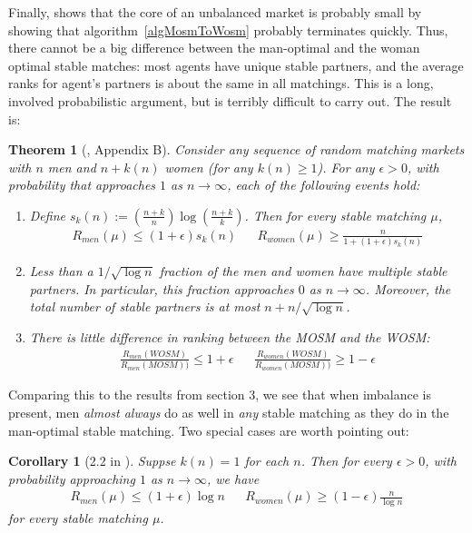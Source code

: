 \documentclass[12pt]{article}
\newtheorem{corollary}[definition]{Corollary}
\newtheorem{theorem}[definition]{Theorem}
\begin{document}
  Finally, \cite{AshlagiUnbalancedCompetition17} shows that the core of an
  unbalanced market is probably small by showing that
  algorithm~\ref{algMosmToWosm} probably terminates quickly.
  Thus, there cannot be a big difference between the man-optimal and the woman
  optimal stable matches: most agents have unique stable partners, and the
  average ranks for agent's partners is about the same in all matchings.
  This is a long, involved probabilistic argument, but is terribly difficult to
  carry out. The result is:

  \begin{theorem}[\cite{AshlagiUnbalancedCompetition17}, Appendix B]
    Consider any sequence of random matching markets with $n$ men and $n+k(n)$ women
    (for any $k(n)\ge 1$).
    For any $\epsilon>0$, with probability that approaches $1$ as $n\to\infty$,
    each of the following events hold:
    \begin{enumerate}
      \item Define $ s_k(n) := \left(\frac{n+k} n\right) 
        \log\left(\frac{n+k} k\right)$.
        Then for every stable matching $\mu$,
        \begin{align*}
          R_{men}(\mu) \le (1+\epsilon)s_k(n) &&
          R_{women}(\mu) \ge \frac n {1 + (1+\epsilon)s_k(n)}
        \end{align*}
      \item Less than a $1/\sqrt{\log n}$ fraction of the men and women have
        multiple stable partners. In particular, this fraction approaches $0$ as
        $n\to\infty$.
        Moreover, the total number of stable partners
        is at most $n + n/\sqrt{\log n}$.
      \item There is little difference in ranking between the MOSM and the WOSM:
        \begin{align*}
          \frac{R_{men}(WOSM)}{R_{men}(MOSM))} \le 1+\epsilon &&
          \frac{R_{women}(WOSM)}{R_{women}(MOSM))} \ge 1-\epsilon
        \end{align*}
    \end{enumerate}
  \end{theorem}

  Comparing this to the results from section 3, we see that when imbalance is
  present, men \emph{almost always} do as well in \emph{any} stable matching as
  they do in the man-optimal stable matching.
  Two special cases are worth pointing out:

  \begin{corollary}[2.2 in \cite{AshlagiUnbalancedCompetition17}]
    Suppse $k(n) = 1$ for each $n$.
    Then for every $\epsilon>0$, with probability approaching $1$ as
    $n\to\infty$, we have
    \begin{align*}
      R_{men}(\mu) \le (1+\epsilon)\log n &&
      R_{women}(\mu) \ge (1-\epsilon)\frac n {\log n}
    \end{align*}
    for every stable matching $\mu$.
  \end{corollary}
\end{document}
